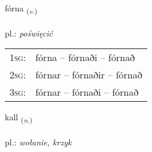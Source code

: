 \documentclass[frontgrid, backgrid]{flacards}\usepackage[]{graphicx}\usepackage[]{xcolor}
\begin{document}
\renewcommand{\flhead}{\vskip5pt \fboxsep=0pt {\small\bfseries\footnotesize Sagnorð | czasownik}}
\renewcommand{\fcfoot}{\vskip5pt \fboxsep=0pt \hspace{2pt}{\small\bfseries\footnotesize 3K}}

\renewcommand{\blhead}{\vskip5pt {\small\bfseries\footnotesize Sagnorð | czasownik }}
\renewcommand{\bcfoot}{\vskip5pt \hspace{2pt}{\small\bfseries\footnotesize 3K}}


{fórna \small{\textsubscript{(\textit{v.})}} \\[1ex] %
\textphonetic{[fourtna]} \\
pl.: \emph{poświęcić} \\  [2ex]
\renewcommand*{\arraystretch}{0.8}
\begin{tabular}{p{1cm}l}
\textsc{1sg}: & fórna -- fórnaði -- fórnað \\ 
\textsc{2sg}: & fórnar -- fórnaðir -- fórnað \\ 
\textsc{3sg}: & fórnar -- fórnaði -- fórnað \\ 
\end{tabular}
}

\renewcommand{\flhead}{\vskip5pt \fboxsep=0pt {\small\bfseries\footnotesize Nafnorð | rzeczownik}}
\renewcommand{\fcfoot}{\vskip5pt \fboxsep=0pt \hspace{2pt}{\small\bfseries\footnotesize 3K}}

\renewcommand{\blhead}{\vskip5pt {\small\bfseries\footnotesize Nafnorð | rzeczownik }}
\renewcommand{\bcfoot}{\vskip5pt \hspace{2pt}{\small\bfseries\footnotesize 3K}}


{kall \small{\textsubscript{(\textit{n.})}} \\[1ex] %
\textphonetic{[kʰatl̥]} \\
pl.: \emph{wołanie, krzyk} \\  [2ex]
\renewcommand*{\arraystretch}{0.8}
}
\end{document}
